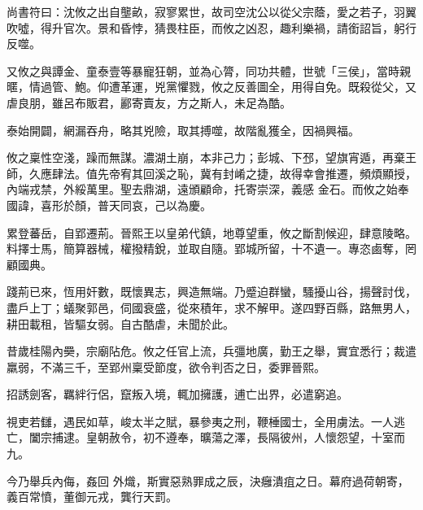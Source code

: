 \begin{pinyinscope}
 尚書符曰：沈攸之出自壟畝，寂寥累世，故司空沈公以從父宗蔭，愛之若子，羽翼吹噓，得升官次。景和昏悖，猜畏柱臣，而攸之凶忍，趣利樂禍，請銜詔旨，躬行反噬。



 又攸之與譚金、童泰壹等暴寵狂朝，並為心膂，同功共體，世號「三侯」，當時親暱，情過管、鮑。仰遭革運，兇黨懼戮，攸之反善圖全，用得自免。既殺從父，又虐良朋，雖呂布販君，酈寄賣友，方之斯人，未足為酷。



 泰始開闢，網漏吞舟，略其兇險，取其搏噬，故階亂獲全，因禍興福。



 攸之稟性空淺，躁而無謀。濃湖土崩，本非己力；彭城、下邳，望旗宵遁，再棄王師，久應肆法。值先帝宥其回溪之恥，冀有封崤之捷，故得幸會推遷，頻煩顯授，內端戎禁，外綏萬里。聖去鼎湖，遠頒顧命，托寄崇深，義感
 金石。而攸之始奉國諱，喜形於顏，普天同哀，己以為慶。



 累登蕃岳，自郢遷荊。晉熙王以皇弟代鎮，地尊望重，攸之斷割候迎，肆意陵略。料擇士馬，簡算器械，權撥精銳，並取自隨。郢城所留，十不遺一。專恣鹵奪，罔顧國典。



 踐荊已來，恆用奸數，既懷異志，興造無端。乃蹙迫群蠻，騷擾山谷，揚聲討伐，盡戶上丁；蟻聚郭邑，伺國衰盛，從來積年，求不解甲。遂四野百縣，路無男人，耕田載租，皆驅女弱。自古酷虐，未聞於此。



 昔歲桂陽內奰，宗廟阽危。攸之任官上流，兵彊地廣，勤王之舉，實宜悉行；裁遣羸弱，不滿三千，至郢州稟受節度，欲令判否之日，委罪晉熙。



 招誘劍客，羈絆行侶，竄叛入境，輒加擁護，逋亡出界，必遣窮追。



 視吏若讎，遇民如草，峻太半之賦，暴參夷之刑，鞭棰國士，全用虜法。一人逃亡，闔宗捕逮。皇朝赦令，初不遵奉，曠蕩之澤，長隔彼州，人懷怨望，十室而九。



 今乃舉兵內侮，姦回
 外熾，斯實惡熟罪成之辰，決癰潰疽之日。幕府過荷朝寄，義百常憤，董御元戎，龔行天罰。




\end{pinyinscope}
